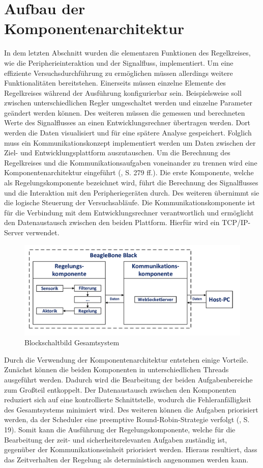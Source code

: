 \section{Aufbau der Komponentenarchitektur}
In dem letzten Abschnitt wurden die elementaren Funktionen des Regelkreises, wie die Peripherieinteraktion und der Signalfluss, implementiert. Um eine effiziente Versuchsdurchführung zu ermöglichen müssen allerdings weitere Funktionalitäten bereitstehen. Einerseits müssen einzelne Elemente des Regelkreises während der Ausführung konfigurierbar sein. Beispielsweise soll zwischen unterschiedlichen Regler umgeschaltet werden und einzelne Parameter geändert werden können. Des weiteren müssen die gemessen und berechneten Werte des Signalflusses an einen Entwicklungsrechner übertragen werden. Dort werden die Daten visualisiert und für eine spätere Analyse gespeichert.
Folglich muss ein Kommunikationskonzept implementiert werden um Daten zwischen der Ziel- und Entwicklungsplattform auszutauschen. Um die Berechnung des Regelkreises und die Kommunikationsaufgaben voneinander zu trennen wird eine Komponentenarchitektur eingeführt (\cite{Wietzke1}, S. 279 ff.). Die erste Komponente, welche als Regelungskomponente bezeichnet wird, führt die Berechnung des Signalflusses und die Interaktion mit den Peripheriegeräten durch. Des weiteren übernimmt sie die logische Steuerung der Versuchsabläufe. Die Kommunikationskomponente ist für die Verbindung mit dem Entwicklungsrechner verantwortlich und ermöglicht den Datenaustausch zwischen den beiden Plattform. Hierfür wird ein TCP/IP-Server verwendet.
\begin{figure}[!h]
\centering
\includegraphics[width=\linewidth]{img/SW_1_KA_BSB.pdf}
\caption{Blockschaltbild Gesamtsystem}
\end{figure}
Durch die Verwendung der Komponentenarchitektur entstehen einige Vorteile. Zunächst können die beiden Komponenten in unterschiedlichen Threads ausgeführt werden. Dadurch wird die Bearbeitung der beiden Aufgabenbereiche zum Großteil entkoppelt. Der Datenaustausch zwischen den Komponenten reduziert sich auf eine kontrollierte Schnittstelle, wodurch die Fehleranfälligkeit des Gesamtsystems minimiert wird. Des weiteren können die Aufgaben priorisiert werden, da der Scheduler eine preemptive Round-Robin-Strategie verfolgt (\cite{Wietzke1}, S. 19). Somit kann die Ausführung der Regelungskomponente, welche für die Bearbeitung der zeit- und sicherheitsrelevanten Aufgaben zuständig ist, gegenüber der Kommunikationseinheit priorisiert werden. Hieraus resultiert, dass das Zeitverhalten der Regelung als deterministisch angenommen werden kann. 

